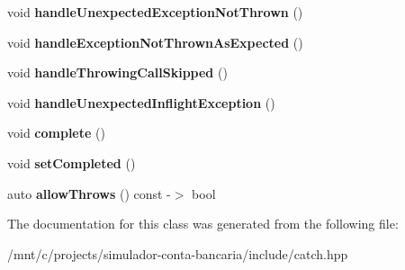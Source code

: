 \begin{DoxyCompactItemize}
void {\bfseries handle\+Unexpected\+Exception\+Not\+Thrown} ()
\item 
\mbox{\label{classCatch_1_1AssertionHandler_a51e4936e3af43b74690cedae6d2e297a}} 
void {\bfseries handle\+Exception\+Not\+Thrown\+As\+Expected} ()
\item 
\mbox{\label{classCatch_1_1AssertionHandler_a67a194d5518f307c4a16faa03a7f7442}} 
void {\bfseries handle\+Throwing\+Call\+Skipped} ()
\item 
\mbox{\label{classCatch_1_1AssertionHandler_aa2504dad6a91f3645e5f52c932c11270}} 
void {\bfseries handle\+Unexpected\+Inflight\+Exception} ()
\item 
\mbox{\label{classCatch_1_1AssertionHandler_a878a9eb828d8a1863c8dcb6575f6f40e}} 
void {\bfseries complete} ()
\item 
\mbox{\label{classCatch_1_1AssertionHandler_a6756bd5395c0ddd28764a9fb4612d5e4}} 
void {\bfseries set\+Completed} ()
\item 
\mbox{\label{classCatch_1_1AssertionHandler_a193bb3999494c46457f3059184c6b251}} 
auto {\bfseries allow\+Throws} () const -\/$>$ bool
\end{DoxyCompactItemize}


The documentation for this class was generated from the following file\+:\begin{DoxyCompactItemize}
\item 
/mnt/c/projects/simulador-\/conta-\/bancaria/include/catch.\+hpp\end{DoxyCompactItemize}
